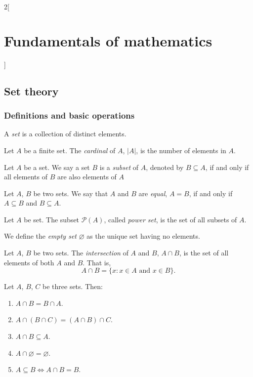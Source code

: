 \documentclass[../../../main.tex]{subfiles}
\begin{document}
\begin{multicols}{2}[\section{Fundamentals of mathematics}]
  \subsection{Set theory}
  \subsubsection{Definitions and basic operations}
  \begin{definition}
    A \emph{set} is a collection of distinct elements.
  \end{definition}
  \begin{definition}
    Let $A$ be a finite set. The \emph{cardinal} of $A$, $|A|$, is the number of elements in $A$.
  \end{definition}
  \begin{definition}
    Let $A$ be a set. We say a set $B$ is a \emph{subset} of $A$, denoted by $B\subseteq A$, if and only if all elements of $B$ are also elements of $A$
  \end{definition}
  \begin{axiom}
    Let $A$, $B$ be two sets. We say that $A$ and $B$ are \textit{equal}, $A=B$, if and only if $A\subseteq B$ and $B\subseteq A$.
  \end{axiom}
  \begin{definition}
    Let $A$ be set. The subset $\mathcal{P}(A)$, called \emph{power set}, is the set of all subsets of $A$.
  \end{definition}
  \begin{definition}
    We define the \emph{empty set} $\varnothing$ as the unique set having no elements.
  \end{definition}
  \begin{definition}
    Let $A$, $B$ be two sets. The \emph{intersection} of $A$ and $B$, $A\cap B$, is the set of all elements of both $A$ and $B$. That is, $$A\cap B=\{x:x\in A\text{ and }x\in B\}.$$
  \end{definition}
  \begin{prop}
    Let $A$, $B$, $C$ be three sets. Then:
    \begin{enumerate}
      \item $A\cap B=B\cap A$.
      \item $A\cap(B\cap C)=(A\cap B)\cap C$.
      \item $A\cap B\subseteq A$.
      \item $A\cap\varnothing=\varnothing$.
      \item $A\subseteq B\iff A\cap B=B$.

\end{enumerate}
\end{prop}
\end{multicols}
\end{document}
